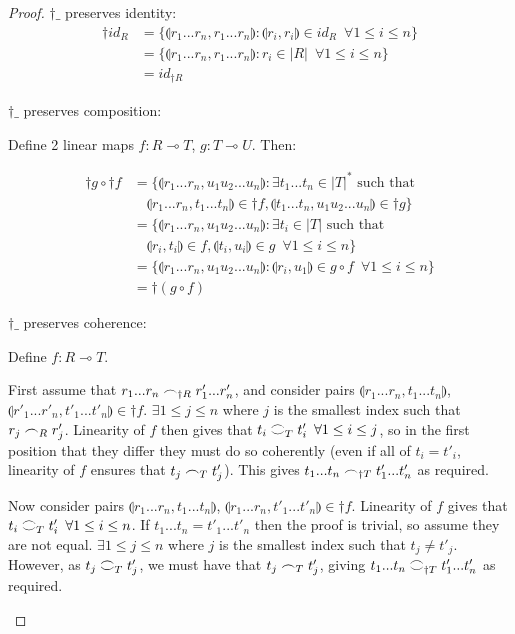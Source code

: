 \documentclass[12pt, oneside]{article}
\theoremstyle{plain}
\theoremstyle{definition}
\let\originaldagger\dagger
\renewcommand{\dag}{\mathord{\originaldagger}}
\newcommand{\lp}{\llparenthesis}
\newcommand{\rp}{\rrparenthesis}
\newcommand{\coh}[1][]{\mathrel{\vcenter{\offinterlineskip\hbox{$\frown$}\vskip0.2ex\hbox{$\smile$}}_{\ifx\\#1\\\else#1\fi}}}
\newcommand{\scoh}[1][]{\mathrel{\frown}_{\ifx\\#1\\\else#1\fi}}
\newcommand{\comp}{\mathbin{\circ}}
\begin{document}
\begin{proof}
    $\dag\_$ preserves identity:
    \begin{align*}
        \dag id_{R} &= \{\lp r_1...r_n,r_1...r_n\rp:\lp r_i,r_i\rp\in id_R\enspace\forall 1\le i\le n\} \\
        &= \{\lp r_1...r_n,r_1...r_n\rp:r_i\in |R|\enspace\forall 1\le i\le n\} \\
        &= id_{\dag R}
    \end{align*}

    $\dag\_$ preserves composition:
    \begin{adjustwidth}{1.5em}{}
        Define 2 linear maps $f:R\multimap T$, $g:T\multimap U$. Then:
    \end{adjustwidth}
    \begin{align*}
        \dag g\comp \dag f &= \{\lp r_1...r_n,u_1u_2...u_n\rp:\exists t_1...t_n\in|T|^* \text{ such that } \\
        &\quad\lp r_1...r_n,t_1...t_n\rp\in\dag f, \lp t_1...t_n,u_1u_2...u_n\rp\in\dag g\} \\
        &= \{\lp r_1...r_n,u_1u_2...u_n\rp:\exists t_i\in|T|\text{ such that } \\
        &\quad\lp r_i,t_i\rp\in f,\lp t_i,u_i\rp\in g\enspace\forall 1\le i\le n\} \\
        &= \{\lp r_1...r_n,u_1u_2...u_n\rp:\lp r_i,u_1\rp\in g\comp f \enspace\forall 1\le i\le n\} \\
        &= \dag(g\comp f)
    \end{align*}

    $\dag\_$ preserves coherence:
    \begin{adjustwidth}{1.5em}{}
        Define $f:R\multimap T$.

        First assume that $r_1...r_n\scoh[\dag R]r'_1...r'_n$, and consider pairs $\lp r_1...r_n,t_1...t_n\rp$, $\lp r'_1...r'_n,t'_1...t'_n\rp\in\dag f$.
        $\exists 1\le j\le n$ where $j$ is the smallest index such that $r_j\scoh[R]r'_j$.
        Linearity of $f$ then gives that $t_i\coh[T]t'_i\enspace\forall 1\le i\le j$, so in the first position that they differ they must do so coherently 
        (even if all of $t_i=t'_i$, linearity of $f$ ensures that $t_j\scoh[T]t'_j$).
        This gives $t_1...t_n\scoh[\dag T]t'_1...t'_n$ as required.

        Now consider pairs $\lp r_1...r_n,t_1...t_n\rp$, $\lp r_1...r_n,t'_1...t'_n\rp\in\dag f$.
        Linearity of $f$ gives that $t_i\coh[T]t'_i\enspace\forall1\le i\le n$.
        If $t_1...t_n=t'_1...t'_n$ then the proof is trivial, so assume they are not equal.
        $\exists 1\le j\le n$ where $j$ is the smallest index such that $t_j\neq t'_j$.
        However, as $t_j\coh[T]t'_j$, we must have that $t_j\scoh[T]t'_j$, giving $t_1...t_n\coh[\dag T]t'_1...t'_n$ as required.
    \end{adjustwidth}
\end{proof}
\end{document}
